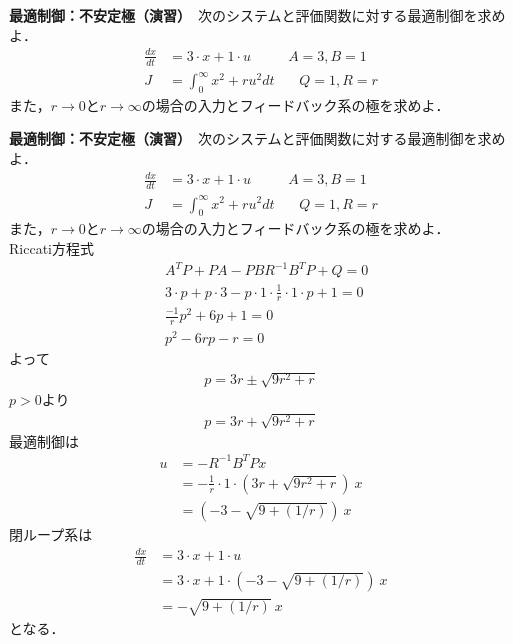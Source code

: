 




\exheader

\noindent
{\bf 最適制御：不安定極（演習）}　次のシステムと評価関数に対する最適制御を求めよ．
\begin{align*}
	\frac{dx}{dt} & = 3 \cdot x + 1 \cdot u \ \ \ \ \ \ \ \ \ \ \ \ A=3,B=1\\
	J & = \int_0^{\infty} x^2 + r u^2 dt \ \ \ \ \ \ \ \ Q=1,R=r
\end{align*}
また，$r\rightarrow 0$と$r\rightarrow \infty$の場合の入力とフィードバック系の極を求めよ．


\newpage

\noindent
{\bf 最適制御：不安定極（演習）}　次のシステムと評価関数に対する最適制御を求めよ．
\begin{align*}
	\frac{dx}{dt} & = 3 \cdot x + 1 \cdot u \ \ \ \ \ \ \ \ \ \ \ \ A=3,B=1\\
	J & = \int_0^{\infty} x^2 + r u^2 dt \ \ \ \ \ \ \ \ Q=1,R=r
\end{align*}
また，$r\rightarrow 0$と$r\rightarrow \infty$の場合の入力とフィードバック系の極を求めよ．
\\

Riccati方程式
\begin{align*}
	& A^T P + P A - P B R^{-1} B^T P + Q = 0 \\
	& 3 \cdot p + p \cdot 3 - p \cdot 1 \cdot \frac{1}{r} \cdot 1 \cdot p + 1 = 0 \\
	& \frac{-1}{r} p^2 + 6p + 1 = 0 \\
	& p^2 -6rp - r = 0
\end{align*}
よって
\begin{align*}
	p = 3 r \pm \sqrt{9 r^2 + r}
\end{align*}
$p>0$より
\begin{align*}
	p = 3 r + \sqrt{9 r^2+r}
\end{align*}
最適制御は
\begin{align*}
	u &= -R^{-1}B^T P x \\
	&= -\frac{1}{r} \cdot 1 \cdot (3 r + \sqrt{9 r^2+r})\  x \\
	&= (-3 - \sqrt{9 + (1/r)}) \ x
\end{align*}
閉ループ系は
\begin{align*}
	\frac{dx}{dt} & = 3 \cdot x + 1 \cdot u \\
	&= 3 \cdot x + 1 \cdot (-3 - \sqrt{9 + (1/r)}) \ x \\
	&= - \sqrt{9 + (1/r)} \  x
\end{align*}
となる．

